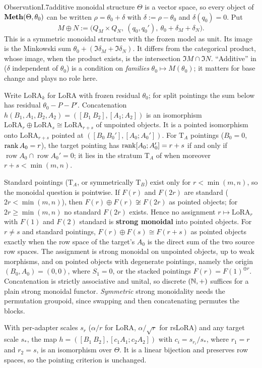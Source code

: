 \begin{restate}{Observation}{I.7}{additive monoidal structure}
$\Theta$ is a vector space, so every object of $\mathbf{Meth}(\Theta,\theta_0)$ can be written $\rho=\theta_0+\delta$ with
$\delta:=\rho-\theta_0$ and $\delta(q_0)=0$. Put
\begin{equation*}
  M\oplus N:=\big(Q_M\times Q_N,\ (q_0,q_0'),\ \theta_0+\delta_M+\delta_N\big).
\end{equation*}
This is a symmetric monoidal structure with the frozen model as unit. Its image is the Minkowski sum
$\theta_0+(\Im\delta_M+\Im\delta_N)$. It differs from the categorical product, whose image, when the product exists, is
the intersection $\Im M\cap\Im N$. ``Additive'' in  ($\delta$ independent of $\theta_0$) is a
condition on \emph{families} $\theta_0\mapsto M(\theta_0)$; it matters for base change and plays no role here.

Write $\mathrm{LoRA}_k$ for LoRA with frozen residual $\theta_0$; for split pointings the sum below has residual
$\theta_0-P-P'$. Concatenation $h(B_1,A_1,B_2,A_2)=([B_1\ B_2],[A_1;A_2])$ is an isomorphism
$\mathrm{LoRA}_r\oplus\mathrm{LoRA}_s\cong\mathrm{LoRA}_{r+s}$ of unpointed objects. It is a pointed isomorphism onto
$\mathrm{LoRA}_{r+s}$ pointed at $([B_0\ B_0'],[A_0;A_0'])$. For $\mathrm T_A$ pointings ($B_0=0$, $\operatorname{rank} A_0=r$), the
target pointing has $\operatorname{rank}[A_0;A_0']=r+s$ if and only if $\operatorname{row}A_0\cap\operatorname{row}A_0'=0$; it lies in the
stratum $\mathrm T_A$ of  when moreover $r+s<\min(m,n)$.

Standard pointings ($\mathrm T_A$, or symmetrically $\mathrm T_B$) exist only for $r<\min(m,n)$, so the monoidal question
is pointwise. If $F(r)$ and $F(2r)$ are standard ($2r<\min(m,n)$), then $F(r)\oplus F(r)\not\cong F(2r)$ as pointed
objects; for $2r\ge\min(m,n)$ no standard $F(2r)$ exists. Hence no assignment $r\mapsto\mathrm{LoRA}_r$ with $F(1)$ and
$F(2)$ standard is \textbf{strong monoidal} into pointed objects. For $r\neq s$ and standard pointings, $F(r)\oplus
F(s)\cong F(r+s)$ as pointed objects exactly when the row space of the target's $A_0$ is the direct sum of the two source
row spaces. The assignment is strong monoidal on unpointed objects, up to weak morphisms, and on pointed objects with
degenerate pointings, namely the origin $(B_0,A_0)=(0,0)$, where $S_1=0$, or the stacked pointings $F(r)=F(1)^{\oplus r}$.
Concatenation is strictly associative and unital, so discrete $(\mathbb{N},+)$ suffices for a plain strong monoidal functor.
\emph{Symmetric} strong monoidality needs the permutation groupoid, since swapping and then concatenating permutes the
blocks.

With per-adapter scales $s_r$ ($\alpha/r$ for LoRA, $\alpha/\sqrt r$ for rsLoRA) and any target scale $s_*$, the map
$h=([B_1\ B_2],[c_1A_1;c_2A_2])$ with $c_i=s_{r_i}/s_*$, where $r_1=r$ and $r_2=s$, is an isomorphism over $\Theta$. It is
a linear bijection and preserves row spaces, so the pointing criterion is unchanged.
\end{restate}

